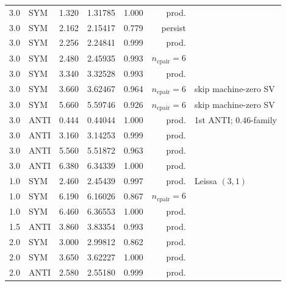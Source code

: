 \begin{longtable}{@{}rllrrrl@{}}
3.0 & SYM  & 1.320 & 1.31785 & 1.000 & prod. & \\
3.0 & SYM  & 2.162 & 2.15417 & 0.779 & persist & \\
3.0 & SYM  & 2.256 & 2.24841 & 0.999 & prod. & \\
3.0 & SYM  & 2.480 & 2.45935 & 0.993 & $n_{\mathrm{cpair}}=6$ & \\
3.0 & SYM  & 3.340 & 3.32528 & 0.993 & prod. & \\
3.0 & SYM  & 3.660 & 3.62467 & 0.964 & $n_{\mathrm{cpair}}=6$ & skip machine-zero SV \\
3.0 & SYM  & 5.660 & 5.59746 & 0.926 & $n_{\mathrm{cpair}}=6$ & skip machine-zero SV \\
3.0 & ANTI & 0.444 & 0.44044 & 1.000 & prod. & 1st ANTI; $0.46$-family \\
3.0 & ANTI & 3.160 & 3.14253 & 0.999 & prod. & \\
3.0 & ANTI & 5.560 & 5.51872 & 0.963 & prod. & \\
3.0 & ANTI & 6.380 & 6.34339 & 1.000 & prod. & \\
1.0 & SYM  & 2.460 & 2.45439 & 0.997 & prod. & Leissa $(3,1)$ \\
1.0 & SYM  & 6.190 & 6.16026 & 0.867 & $n_{\mathrm{cpair}}=6$ & \\
1.0 & SYM  & 6.460 & 6.36553 & 1.000 & prod. & \\
1.5 & ANTI & 3.860 & 3.83354 & 0.993 & prod. & \\
2.0 & SYM  & 3.000 & 2.99812 & 0.862 & prod. & \\
2.0 & SYM  & 3.650 & 3.62227 & 1.000 & prod. & \\
2.0 & ANTI & 2.580 & 2.55180 & 0.999 & prod. & \\
\bottomrule
\end{longtable}
